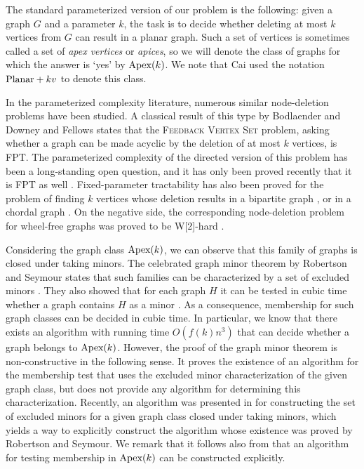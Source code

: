 \documentclass{llncs}
\begin{document}
The standard parameterized version of our problem is the
following: given a graph $G$ and a parameter $k$, the task is to
decide whether deleting at most $k$ vertices from $G$ can result in a planar graph.
Such a set of vertices is sometimes called a set of \emph{apex vertices} or \emph{apices},
so we will denote the class of graphs for which the answer is `yes' by $\textup{Apex}(k)$.
We note that Cai \cite{cai96} used the notation $\textup{Planar} + kv$ to denote this class.

In the parameterized complexity literature, numerous similar node-deletion problems have been studied.
A classical result of this type by Bodlaender \cite{bod94} and Downey and Fellows \cite{dow92} states that
the \textsc{Feedback Vertex Set} problem, asking whether a graph can be made acyclic by the deletion of at most $k$ vertices,
is FPT. The parameterized complexity of the directed version of this problem has been a long-standing open question,
and it has only been proved recently that it is FPT as well \cite{che07}.
Fixed-parameter tractability has also been proved for the problem of finding $k$ vertices whose deletion results
in a bipartite graph \cite{ree04}, or in a chordal graph \cite{marxx}.
On the negative side, the corresponding node-deletion problem for wheel-free graphs was proved to be W[2]-hard \cite{lok08}.

Considering the graph class $\textup{Apex}(k)$,
we can observe that this family of graphs is closed under taking minors.
The celebrated graph minor theorem by Robertson and Seymour states that such families can be characterized by
a set of excluded minors \cite{sey04}. They also showed that for each graph $H$ it can be tested in cubic time whether
a graph contains $H$ as a minor \cite{sey95}. As a consequence, membership for such graph classes can be decided in cubic time.
In particular, we know that there exists an algorithm with running time $O(f(k)n^3)$ that
can decide whether a graph belongs to $\textup{Apex}(k)$.
However, the proof of the graph minor theorem is non-constructive in the following sense.
It proves the existence of an algorithm for the membership test that uses the excluded minor
characterization of the given graph class, but does not provide any algorithm for determining this characterization.
Recently, an algorithm was presented in \cite{adl08} for constructing the set of excluded minors
for a given graph class closed under taking minors,
which yields a way to explicitly construct the algorithm whose existence was proved by Robertson and Seymour.
We remark that it follows also from \cite{fel89} that an algorithm for testing membership in
$\textup{Apex}(k)$ can be constructed explicitly.
\end{document}
